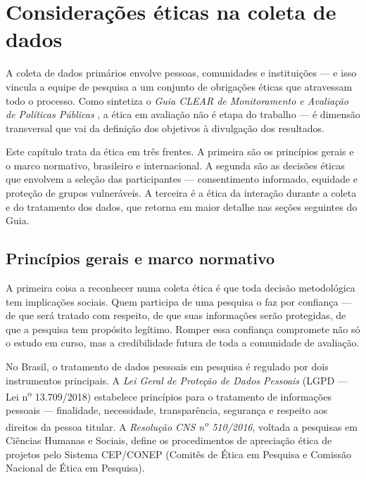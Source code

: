 \documentclass[12pt, a4paper, openany]{book}
\begin{document}
\chapter{Considera\c{c}\~oes \'eticas na coleta de dados}

A coleta de dados prim\'arios envolve pessoas, comunidades e institui\c{c}\~oes --- e isso vincula a equipe de pesquisa a um conjunto de obriga\c{c}\~oes \'eticas que atravessam todo o processo. Como sintetiza o \textit{Guia CLEAR de Monitoramento e Avalia\c{c}\~ao de Pol\'iticas P\'ublicas} \citep{fgvclear2025mea}, a \'etica em avalia\c{c}\~ao n\~ao \'e etapa do trabalho --- \'e dimens\~ao transversal que vai da defini\c{c}\~ao dos objetivos \`a divulga\c{c}\~ao dos resultados.

Este cap\'itulo trata da \'etica em tr\^es frentes. A primeira s\~ao os princ\'ipios gerais e o marco normativo, brasileiro e internacional. A segunda s\~ao as decis\~oes \'eticas que envolvem a sele\c{c}\~ao das participantes --- consentimento informado, equidade e prote\c{c}\~ao de grupos vulner\'aveis. A terceira \'e a \'etica da intera\c{c}\~ao durante a coleta e do tratamento dos dados, que retorna em maior detalhe nas se\c{c}\~oes seguintes do Guia.

\section{Princ\'ipios gerais e marco normativo}

A primeira coisa a reconhecer numa coleta \'etica \'e que toda decis\~ao metodol\'ogica tem implica\c{c}\~oes sociais. Quem participa de uma pesquisa o faz por confian\c{c}a --- de que ser\'a tratado com respeito, de que suas informa\c{c}\~oes ser\~ao protegidas, de que a pesquisa tem prop\'osito leg\'itimo. Romper essa confian\c{c}a compromete n\~ao s\'o o estudo em curso, mas a credibilidade futura de toda a comunidade de avalia\c{c}\~ao.

No Brasil, o tratamento de dados pessoais em pesquisa \'e regulado por dois instrumentos principais. A \textit{Lei Geral de Prote\c{c}\~ao de Dados Pessoais} (LGPD --- Lei n\textsuperscript{o} 13.709/2018) estabelece princ\'ipios para o tratamento de informa\c{c}\~oes pessoais --- finalidade, necessidade, transpar\^encia, seguran\c{c}a e respeito aos direitos da pessoa titular. A \textit{Resolu\c{c}\~ao CNS n\textsuperscript{o} 510/2016}, voltada a pesquisas em Ci\^encias Humanas e Sociais, define os procedimentos de aprecia\c{c}\~ao \'etica de projetos pelo Sistema CEP/CONEP (Comit\^es de \'Etica em Pesquisa e Comiss\~ao Nacional de \'Etica em Pesquisa).
\end{document}
